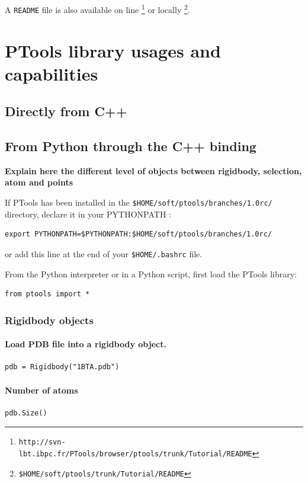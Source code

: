 \documentclass[12pt,a4paper]{article}
\begin{document}
A {\tt README} file is also available on line 
\footnote{\tt http://svn-lbt.ibpc.fr/PTools/browser/ptools/trunk/Tutorial/README} 
or locally \footnote{\tt \$HOME/soft/ptools/trunk/Tutorial/README}.


\section{PTools library usages and capabilities}

\subsection{Directly from C++}

\subsection{From Python through the C++ binding}

\vspace*{1cm}
{\bf Explain here the different level of objects between rigidbody, selection, atom and points}
\vspace*{1cm}

If PTools has been installed in the {\tt \$HOME/soft/ptools/branches/1.0rc/} directory, 
declare it in your PYTHONPATH :

\begin{verbatim}
export PYTHONPATH=$PYTHONPATH:$HOME/soft/ptools/branches/1.0rc/
\end{verbatim}
or add this line at the end of your {\tt \$HOME/.bashrc} file.


From the Python interpreter or in a Python script, first load the PTools library:
\begin{verbatim}
from ptools import *
\end{verbatim}


\subsubsection{Rigidbody objects}

\paragraph{Load PDB file into a rigidbody object.}
\begin{verbatim}
pdb = Rigidbody("1BTA.pdb")
\end{verbatim}


\paragraph{Number of atoms}
\begin{verbatim}
pdb.Size()
\end{verbatim}
\end{document}
